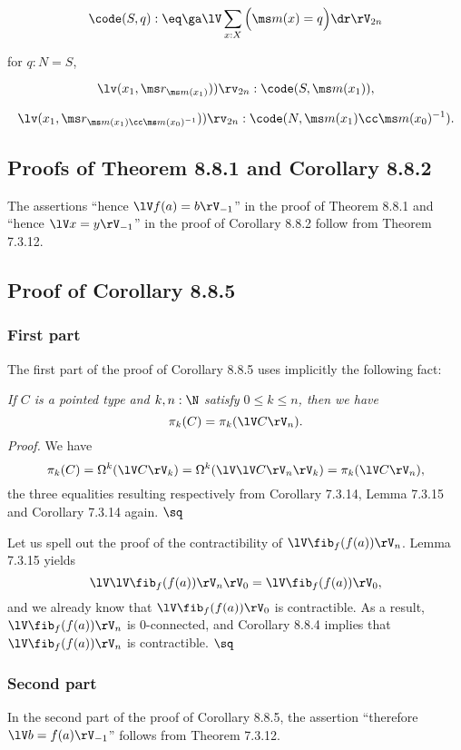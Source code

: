 \documentclass[12pt]{article}
\begin{document}
$$\code(S,q):\eq\ga\lV\sum_{x:X}\Big(\ms m(x)=q\Big)\dr\rV_{2n}$$

\nn for $q:N=S$,

$$\lv(x_1,\ms r_{\ms m(x_1)}))\rv_{2n}:\code(S,\ms m(x_1)),$$ 

$$\lv(x_1,\ms r_{\ms m(x_1)\cc\ms m(x_0)^{-1}}))\rv_{2n}:\code(N,\ms m(x_1)\cc\ms m(x_0)^{-1}).$$


\subsection{Proofs of Theorem 8.8.1 and Corollary 8.8.2}

The assertions ``hence $\lV f(a)=b\rV_{-1}$'' in the proof of Theorem 8.8.1 and ``hence $\lV x=y\rV_{-1}$'' in the proof of Corollary 8.8.2 follow from Theorem 7.3.12.


\subsection{Proof of Corollary 8.8.5}

\subsubsection{First part}

The first part of the proof of Corollary 8.8.5 uses implicitly the following fact:

\nn\emph{If $C$ is a pointed type and $k,n:\N$ satisfy $0\le k\le n$, then we have} 
$$
\pi_k(C)=\pi_k(\lV C\rV_n).
$$
\emph{Proof.} We have 
$$
\pi_k(C)=\Omega^k(\lV C\rV_k)=\Omega^k(\lV\lV C\rV_n\rV_k)=\pi_k(\lV C\rV_n),
$$ 
the three equalities resulting respectively from Corollary 7.3.14, Lemma 7.3.15 and Corollary 7.3.14 again. $\sq$

Let us spell out the proof of the contractibility of $\lV\fib_f(f(a))\rV_n$. Lemma 7.3.15 yields 
$$
\lV\lV\fib_f(f(a))\rV_n\rV_0=\lV\fib_f(f(a))\rV_0,
$$ 
and we already know that $\lV\fib_f(f(a))\rV_0$ is contractible. As a result, $\lV\fib_f(f(a))\rV_n$ is 0-connected, and Corollary 8.8.4 implies that $\lV\fib_f(f(a))\rV_n$ is contractible. $\sq$

\subsubsection{Second part}

In the second part of the proof of Corollary 8.8.5, the assertion ``therefore $\lV b=f(a)\rV_{-1}$'' follows from Theorem 7.3.12.
\end{document}

